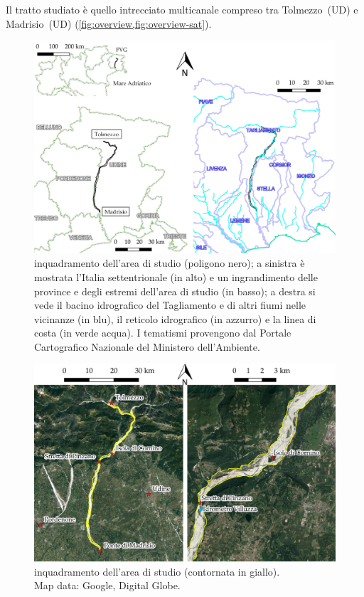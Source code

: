Il tratto studiato è quello intrecciato multicanale compreso tra Tolmezzo~(UD) e Madrisio~(UD) (\vref{fig:overview,fig:overview-sat}). 
%
\begin{figure}
	\centering
	\includegraphics[width=\textwidth]{files/overview.jpeg}
	\caption[inquadramento dell'area di studio]
		{inquadramento dell'area di studio (poligono nero); a sinistra è mostrata l'Italia settentrionale (in alto) e un ingrandimento delle province e degli estremi dell'area di studio (in basso); a destra si vede il bacino idrografico del Tagliamento e di altri fiumi nelle vicinanze (in blu), il reticolo idrografico (in azzurro) e la linea di costa (in verde acqua). I tematismi provengono dal Portale Cartografico Nazionale del Ministero dell'Ambiente.}
	\label{fig:overview}
\end{figure}
%
\begin{figure}
	\centering
	\includegraphics[width=\textwidth]{files/overview_tratto_sat.jpeg}
	\caption[inquadramento dell'area di studio]{inquadramento dell'area di studio (contornata in giallo).
	\\
	Map data: Google, Digital Globe.}
	\label{fig:overview-sat}
\end{figure}
